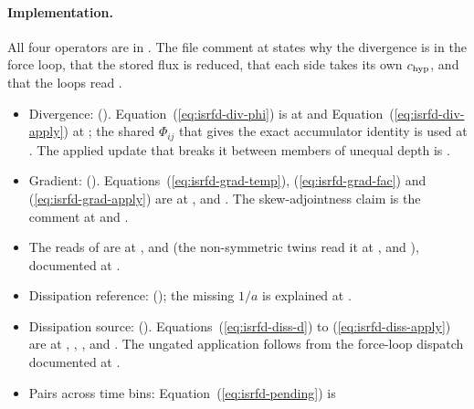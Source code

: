 \paragraph{Implementation.} All four operators are in
. The file comment at
 states why the divergence is in the
force loop, that the stored flux is reduced, that each side takes its own
$c_{\rm hyp}$, and that the loops read .
\begin{itemize}
  \item Divergence: 
    ().
    Equation~(\ref{eq:isrfd-div-phi}) is at  and
    Equation~(\ref{eq:isrfd-div-apply}) at ; the shared
    $\Phi_{ij}$ that gives the exact accumulator identity is used at
    . The applied update that breaks it between members of unequal
    depth is .
  \item Gradient: 
    ().
    Equations~(\ref{eq:isrfd-grad-temp}), (\ref{eq:isrfd-grad-fac}) and
    (\ref{eq:isrfd-grad-apply}) are at ,  and
    . The skew-adjointness claim is the comment at
     and
    .
  \item The reads of  are at
    ,  and
     (the non-symmetric twins read it at ,  and ), documented at .
  \item Dissipation reference:
    (); the missing $1/a$ is explained
    at .
  \item Dissipation source:
    ().
    Equations~(\ref{eq:isrfd-diss-d}) to (\ref{eq:isrfd-diss-apply}) are at
    , , ,  and
    . The ungated application follows from the force-loop
    dispatch documented at .
  \item Pairs across time bins: Equation~(\ref{eq:isrfd-pending}) is

\end{itemize}
